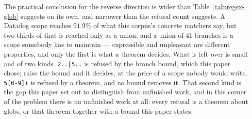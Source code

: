\iffull\fi
\iffull\fi

\iffull\fi

\inlineonly{\noindent}%
The practical conclusion for the reverse direction is wider than
Table~\ref{tab:regex-glob} suggests on its own, and narrower than the refusal count
suggests. A Datadog scope reaches $91.9\%$ of what this corpus's concrete matchers say,
but two thirds of that is reached only as a union, and a union of $41$ branches is a
scope somebody has to maintain --- expressible and unpleasant are different properties,
and only the first is what a theorem decides. What is left over is small and of two
kinds. \texttt{2..|5..} is refused by the branch bound, which this paper chose; raise
the bound and it decides, at the price of a scope nobody would write. \texttt{5[0-9]+}
is refused by a theorem, and no bound removes it. That second kind is the gap this
paper set out to distinguish from unfinished work, and in this corner of the problem
there is no unfinished work at all: every refusal is a theorem about globs, or that
theorem together with a bound this paper states.
